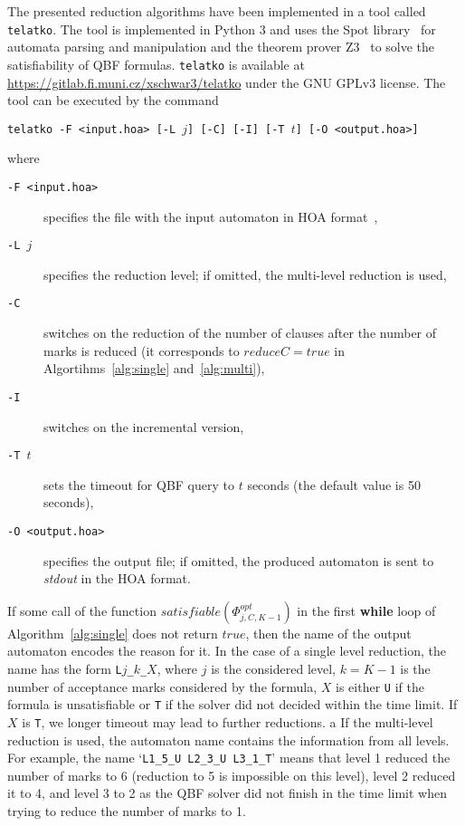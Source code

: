 \documentclass[a4paper,UKenglish,cleveref,autoref,thm-restate]{lipics-v2021}
\def\true{\mathit{true}}
\newcommand{\telatko}{\texttt{telatko}\xspace}
\begin{document}
The presented reduction algorithms have been implemented in a tool
called \telatko. The tool is implemented in Python 3 and uses the Spot
library~\cite{duret.16.atva2} for automata parsing and manipulation
and the theorem prover Z3~\cite{demoura.08.tacas} to solve the
satisfiability of QBF formulas. \telatko is available at
\url{https://gitlab.fi.muni.cz/xschwar3/telatko} under the GNU GPLv3
license. The tool can be executed by the command 
\begin{center}
  \texttt{telatko -F <input.hoa> [-L }$j$\texttt{] [-C] [-I] [-T }$t$\texttt{] [-O <output.hoa>]}
\end{center}
where
\begin{description}
\item[\texttt{-F <input.hoa>}] specifies the file with the input automaton in HOA format~\cite{babiak.15.cav}, 
\item[\texttt{-L }$j$] specifies the reduction level; if omitted, the multi-level reduction is used,
\item[\texttt{-C}] switches on the reduction of the number of clauses
  after the number of marks is reduced (it corresponds to
  $\mathit{reduceC}=\true$ in Algortihms~\ref{alg:single}
  and~\ref{alg:multi}),
\item[\texttt{-I}] switches on the incremental version,
\item[\texttt{-T }$t$] sets the timeout for QBF query to $t$ seconds (the default value is 50 seconds), 
\item[\texttt{-O <output.hoa>}] specifies the output file; if omitted,
  the produced automaton is sent to \textit{stdout} in the HOA format.
\end{description}

If some call of the function
$\mathit{satisfiable}(\Phi^\mathit{opt}_{j,C,K{-}1})$ in the first
\textbf{while} loop of Algorithm~\ref{alg:single} does not return
$\true$, then the name of the output automaton encodes the reason for
it. In the case of a single level reduction, the name has the form
\texttt{L$j$\_$k$\_$X$}, where $j$ is the considered level, $k=K-1$ is
the number of acceptance marks considered by the formula, $X$ is either
\texttt{U} if the formula is unsatisfiable or \texttt{T} if the solver
did not decided within the time limit. If $X$ is \texttt{T}, we longer
timeout may lead to further reductions. a If the multi-level reduction
is used, the automaton name contains the information from all
levels. For example, the name `\texttt{L1\_5\_U L2\_3\_U L3\_1\_T}'
means that level 1 reduced the number of marks to 6 (reduction to 5 is
impossible on this level), level 2 reduced it to 4, and level 3 to 2
as the QBF solver did not finish in the time limit when trying to
reduce the number of marks to
1.%
\end{document}
